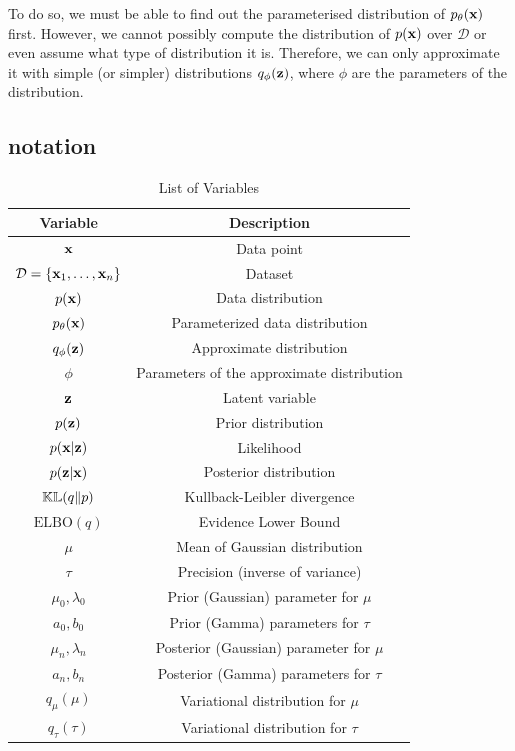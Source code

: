 \documentclass{article}
\begin{document}
To do so, we must be able to find out the parameterised distribution of $p_\theta({\mathbf x})$ first. However, we cannot possibly compute the distribution of $p({\mathbf x})$ over $\mathcal{D}$ or even assume what type of distribution it is. Therefore, we can only approximate it with simple (or simpler) distributions $q_\phi({\mathbf z})$, where $\phi$ are the parameters of the distribution.

\subsection{notation}

\begin{table}[h]
\centering
\begin{tabular}{|c|c|}
\hline
\textbf{Variable} & \textbf{Description} \\ \hline
${\mathbf x}$ & Data point \\ \hline
$\mathcal{D} = \{{\mathbf x}_1, \dots, {\mathbf x}_n \}$ & Dataset \\ \hline
$p({\mathbf x})$ & Data distribution \\ \hline
$p_\theta({\mathbf x})$ & Parameterized data distribution \\ \hline
$q_\phi({\mathbf z})$ & Approximate distribution \\ \hline
$\phi$ & Parameters of the approximate distribution \\ \hline
${\mathbf z}$ & Latent variable \\ \hline
$p({\mathbf z})$ & Prior distribution \\ \hline
$p({\mathbf x} | {\mathbf z})$ & Likelihood \\ \hline
$p({\mathbf z} | {\mathbf x})$ & Posterior distribution \\ \hline
$\mathbb{KL}(q\|p)$ & Kullback-Leibler divergence \\ \hline
$\text{ELBO}(q)$ & Evidence Lower Bound \\ \hline
$\mu$ & Mean of Gaussian distribution \\ \hline
$\tau$ & Precision (inverse of variance) \\ \hline
$\mu_0, \lambda_0$ & Prior (Gaussian) parameter for $\mu$\\ \hline
$a_0, b_0$ & Prior (Gamma) parameters for $\tau$ \\ \hline
$\mu_n, \lambda_n$ & Posterior (Gaussian) parameter for $\mu$ \\ \hline
$a_n, b_n$ & Posterior (Gamma) parameters for $\tau$ \\ \hline
$q_\mu(\mu)$ & Variational distribution for $\mu$ \\ \hline
$q_\tau(\tau)$ & Variational distribution for $\tau$ \\ \hline
\end{tabular}
\caption{List of Variables}
\label{tab:variables}
\end{table}
\end{document}
